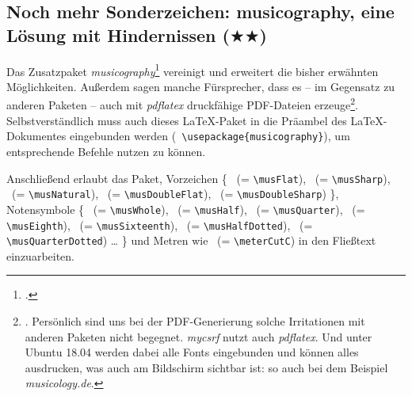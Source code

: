 %
%
%



\subsection{Noch mehr Sonderzeichen: musicography, eine Lösung mit Hindernissen 
($\bigstar\bigstar$)}

Das Zusatzpaket \textit{musicography}\footcite[vgl.][\nopage
wp]{CtanMusicography2018a} vereinigt und erweitert die bisher erwähnten
Möglichkeiten. Außerdem sagen manche Fürsprecher, dass es -- im Gegensatz zu
anderen Paketen -- auch mit \textit{pdflatex} druckfähige PDF-Dateien
erzeuge\footnote{\cite[Vgl. dazu etwa][1]{Cashner2018a}. Persönlich sind uns bei
der PDF-Generierung solche Irritationen mit anderen Paketen nicht begegnet.
\textit{mycsrf} nutzt auch \textit{pdflatex}. Und unter Ubuntu 18.04 werden dabei
alle Fonts eingebunden und können alles ausdrucken, was auch am Bildschirm
sichtbar ist: so auch bei dem Beispiel \textit{musicology.de}.}.
Selbstverständlich muss auch dieses \LaTeX-Paket in die Präambel des
\LaTeX-Dokumentes eingebunden werden (\texttt{\small
\textbackslash{usepackage\{musicography\}}}), um entsprechende Befehle nutzen zu
können.

Anschließend erlaubt das Paket, Vorzeichen \{
\musFlat \ (= \texttt{\small \textbackslash{musFlat}}),
\musSharp \ (= \texttt{\small \textbackslash{musSharp}}),
\musNatural \ (= \texttt{\small \textbackslash{musNatural}}),
\musDoubleFlat \ (= \texttt{\small \textbackslash{musDoubleFlat}}),
\musDoubleSharp \ (= \texttt{\small \textbackslash{musDoubleSharp}})
\}, Notensymbole \{
\musWhole \ (= \texttt{\small \textbackslash{musWhole}}),
\musHalf \ (= \texttt{\small \textbackslash{musHalf}}),
\musQuarter \ (= \texttt{\small \textbackslash{musQuarter}}),
\musEighth \ (= \texttt{\small \textbackslash{musEighth}}),
\musSixteenth \ (= \texttt{\small \textbackslash{musSixteenth}}),
\musHalfDotted \ (= \texttt{\small \textbackslash{musHalfDotted}}),
\musQuarterDotted \ (= \texttt{\small \textbackslash{musQuarterDotted}})
\ldots
\}
und Metren wie \meterCutC \ (= \texttt{\small \textbackslash{meterCutC}})
in den Fließtext einzuarbeiten.

